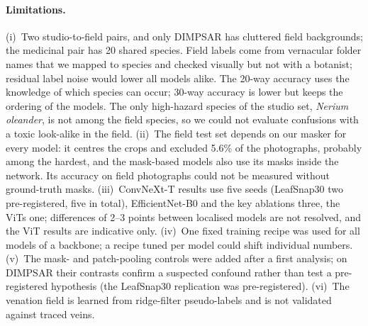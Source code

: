 \paragraph{Limitations.} (i)~Two studio-to-field pairs, and only DIMPSAR has cluttered field
backgrounds; the medicinal pair has 20 shared species. Field
labels come from vernacular folder names that we mapped to species and checked visually but not with a
botanist; residual label noise would lower all models alike. The 20-way accuracy uses the knowledge of
which species can occur; 30-way accuracy is lower but keeps the ordering of the models. The only high-hazard species of the studio set, \textit{Nerium oleander}, is
not among the field species, so we could not evaluate confusions with a toxic look-alike in the
field. (ii)~The field test set depends on our masker for every model: it centres the crops and excluded
5.6\% of the photographs, probably among the hardest, and the mask-based models also use its masks
inside the network. Its accuracy on field photographs could not be measured without ground-truth
masks. (iii)~ConvNeXt-T results use five seeds (LeafSnap30 two pre-registered, five in total),
EfficientNet-B0 and the key ablations three, the ViTs one; differences of 2--3 points between
localised models are not resolved, and the ViT results are indicative only. (iv)~One fixed training
recipe was used for all models of a backbone; a recipe tuned per model could shift individual numbers.
(v)~The mask- and patch-pooling controls were added after a first analysis; on DIMPSAR their
contrasts confirm a suspected confound rather than test a pre-registered hypothesis (the LeafSnap30
replication was pre-registered). (vi)~The venation field is learned
from ridge-filter pseudo-labels and is not validated against traced veins.
